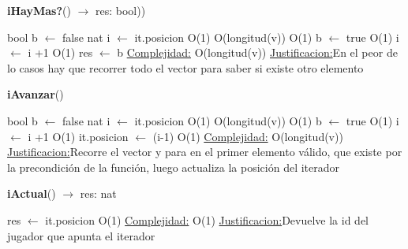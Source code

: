 \begin{Algoritmos}
\begin{algorithm}[H]{\textbf{iHayMas?}() $\to$ res: bool))}
	\begin{algorithmic}[1]
		\State bool b $\gets$ false
		\State nat i $\gets$ it.posicion \Comment O(1)
		 \Comment O(longitud(v))
			 \Comment O(1)
				\State b $\gets$ true \Comment O(1)
			\EndIf
		\State i $\gets$ i +1 \Comment O(1)		
		\EndWhile
		\State res $\gets$ b
		\medskip
		\Statex \underline{Complejidad:} O(longitud(v))
		\Statex \underline{Justificacion:}En el peor de lo casos hay que recorrer todo el vector para saber si existe otro elemento

\end{algorithmic}
\end{algorithm}	
		
\begin{algorithm}[H]{\textbf{iAvanzar}()}
	\begin{algorithmic}[1]
		\State bool b $\gets$ false
		\State nat i $\gets$ it.posicion \Comment O(1)
		 \Comment O(longitud(v))
			 \Comment O(1)
				\State b $\gets$ true \Comment O(1)
			\EndIf
		\State i $\gets$ i +1 \Comment O(1)		
		\EndWhile
		\State it.posicion $\gets$ (i-1) \Comment O(1)
		\medskip
		\Statex \underline{Complejidad:} O(longitud(v))
		\Statex \underline{Justificacion:}Recorre el vector y para en el primer elemento válido, que existe por la precondición de la función, luego actualiza la posición del iterador  
	\end{algorithmic}
\end{algorithm}

\begin{algorithm}[H]{\textbf{iActual}() $\to$ res: nat}
	\begin{algorithmic}[1]
		\State res $\gets$ it.posicion \Comment O(1)
		\medskip
		\Statex \underline{Complejidad:} O(1)
		\Statex \underline{Justificacion:}Devuelve la id del jugador que apunta el iterador  
	\end{algorithmic}
\end{algorithm}
	

\end{Algoritmos}
